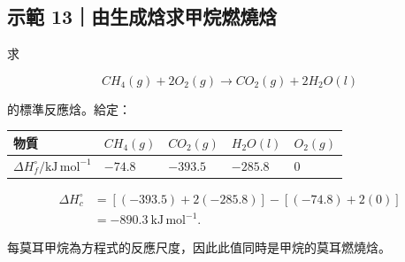\documentclass[11pt,a4paper]{article}
\newcounter{none}
\begin{document}
\begin{HandoutWorkedExample}

\subsection{示範 13｜由生成焓求甲烷燃燒焓}\label{ux793aux7bc4-13ux7531ux751fux6210ux7113ux6c42ux7532ux70f7ux71c3ux71d2ux7113}

求

\[
CH_4(g)+2O_2(g)\rightarrow CO_2(g)+2H_2O(l)
\]

的標準反應焓。給定：

{\def\LTcaptype{none} %
\begin{longtable}[]{@{}
  >{\raggedright\arraybackslash}p{}
  >{\raggedleft\arraybackslash}p{}
  >{\raggedleft\arraybackslash}p{}
  >{\raggedleft\arraybackslash}p{}
  >{\raggedleft\arraybackslash}p{}@{}}
\toprule\noalign{}
\begin{minipage}[b]{\linewidth}\raggedright
物質
\end{minipage} & \begin{minipage}[b]{\linewidth}\raggedleft
\(CH_4(g)\)
\end{minipage} & \begin{minipage}[b]{\linewidth}\raggedleft
\(CO_2(g)\)
\end{minipage} & \begin{minipage}[b]{\linewidth}\raggedleft
\(H_2O(l)\)
\end{minipage} & \begin{minipage}[b]{\linewidth}\raggedleft
\(O_2(g)\)
\end{minipage} \\
\midrule\noalign{}
\endhead
\bottomrule\noalign{}
\endlastfoot
\(\Delta H_f^\circ/\mathrm{kJ\,mol^{-1}}\) & \(-74.8\) & \(-393.5\) & \(-285.8\) & \(0\) \\
\end{longtable}
}

\[
\begin{aligned}
\Delta H_c^\circ
&=[(-393.5)+2(-285.8)]-[(-74.8)+2(0)]\\
&=-890.3\ \mathrm{kJ\,mol^{-1}}.
\end{aligned}
\]

每莫耳甲烷為方程式的反應尺度，因此此值同時是甲烷的莫耳燃燒焓。

\end{HandoutWorkedExample}
\end{document}
